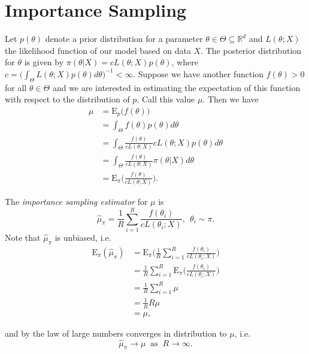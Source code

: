 \documentclass[
  12pt]{article}
\begin{document}
\section{Importance Sampling}\label{importance-sampling}

Let \(p(\theta)\) denote a prior distribution for a parameter
\(\theta \in \Theta \subseteq \mathbb{R}^d\) and \(L(\theta; X)\) the
likelihood function of our model based on data \(X\). The posterior
distribution for \(\theta\) is given by
\(\pi(\theta | X) = cL(\theta;X)p(\theta)\), where
\(c = \big(\int_{\Theta} L(\theta;X) p(\theta) d\theta\big)^{-1} < \infty.\)
Suppose we have another function \(f(\theta) >0\) for all
\(\theta \in \Theta\) and we are interested in estimating the
expectation of this function with respect to the distribution of \(p\).
Call this value \(\mu\). Then we have \[
\begin{aligned}
\mu &= \text{E}_p\big(f(\theta)\big) \\
    &= \int_{\Theta} f(\theta)p(\theta) d\theta \\
    &= \int_{\Theta} \frac{f(\theta)}{c L(\theta;X)} c L(\theta;X) p(\theta) d\theta \\
    &= \int_{\Theta} \frac{f(\theta)}{c L(\theta;X)} \pi(\theta | X) d\theta \\
    &= \text{E}_{\pi}\Bigg(\frac{f(\theta)}{c L(\theta;X)}\Bigg).
\end{aligned}
\]

The \emph{importance sampling estimator} for \(\mu\) is \[
\hat{\mu}_{\pi} = \frac{1}{R} \sum_{i=1}^R \frac{f(\theta_i)}{c L(\theta_i;X)}, \> \> \theta_i \sim \pi.
\] Note that \(\hat{\mu}_{\pi}\) is unbiased, i.e.~ \[
\begin{aligned}
\text{E}_{\pi}(\hat{\mu}_{\pi}) &= \text{E}_{\pi}\Bigg(\frac{1}{R} \sum_{i=1}^R \frac{f(\theta_i)}{c L(\theta_i;X)}\Bigg) \\
                                &= \frac{1}{R} \sum_{i=1}^R\text{E}_{\pi}\Bigg(\frac{f(\theta_i)}{c L(\theta_i;X)}\Bigg) \\
                                &= \frac{1}{R} \sum_{i=1}^R \mu \\
                                &= \frac{1}{R} R\mu \\
                                &= \mu,
\end{aligned}
\]

and by the law of large numbers converges in distribution to \(\mu\),
i.e. \[
\hat{\mu}_{\pi} \to \mu \> \text{ as } \> R \to \infty.
\]
\end{document}

